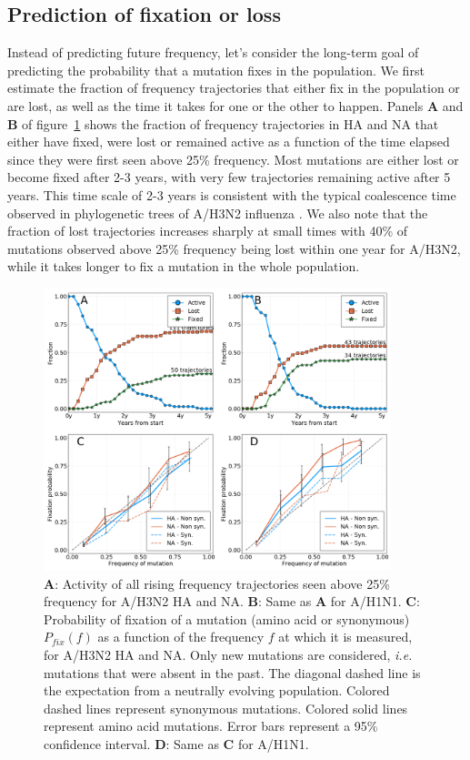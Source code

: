 \documentclass[reprint,amsmath,amssymb,superscriptaddress,showpacs,rmp]{revtex4-1}
\begin{document}
\subsection*{Prediction of fixation or loss}
Instead of predicting future frequency, let's consider the long-term goal of predicting the probability that a mutation fixes in the population.
We first estimate the fraction of frequency trajectories that either fix in the population or are lost, as well as the time it takes for one or the other to happen.
Panels \textbf{A} and \textbf{B} of figure~\ref{fig:fix_loss_active} shows the fraction of frequency trajectories in HA and NA that either have fixed, were lost or remained active as a function of the time elapsed since they were first seen above 25\% frequency.
Most mutations are either lost or become fixed after 2-3 years, with very few trajectories remaining active after 5 years.
This time scale of 2-3 years is consistent with the typical coalescence time observed in phylogenetic trees of A/H3N2 influenza \citep{rambaut_genomic_2008,yan_phylodynamic_2019}.
We also note that the fraction of lost trajectories increases sharply at small times with 40\% of mutations observed above 25\% frequency being lost within one year for A/H3N2, while it takes longer to fix a mutation in the whole population.

\begin{figure}
	\centering
	\includegraphics[width=0.9\textwidth]{./Figures/Panel2.png}
	\caption{\textbf{A}: Activity of all rising frequency trajectories seen above 25\% frequency for A/H3N2 HA and NA. \textbf{B}: Same as \textbf{A} for A/H1N1. \textbf{C}: Probability of fixation of a mutation (amino acid or synonymous) $P_{fix}(f)$ as a function of the frequency $f$ at which it is measured, for A/H3N2 HA and NA. Only new mutations are considered, \emph{i.e.} mutations that were absent in the past. The diagonal dashed line is the expectation from a neutrally evolving population. Colored dashed lines represent synonymous mutations. Colored solid lines represent amino acid mutations. Error bars represent a 95\% confidence interval. \textbf{D}: Same as \textbf{C} for A/H1N1.}
	\label{fig:fix_loss_active}
\end{figure}
\end{document}
